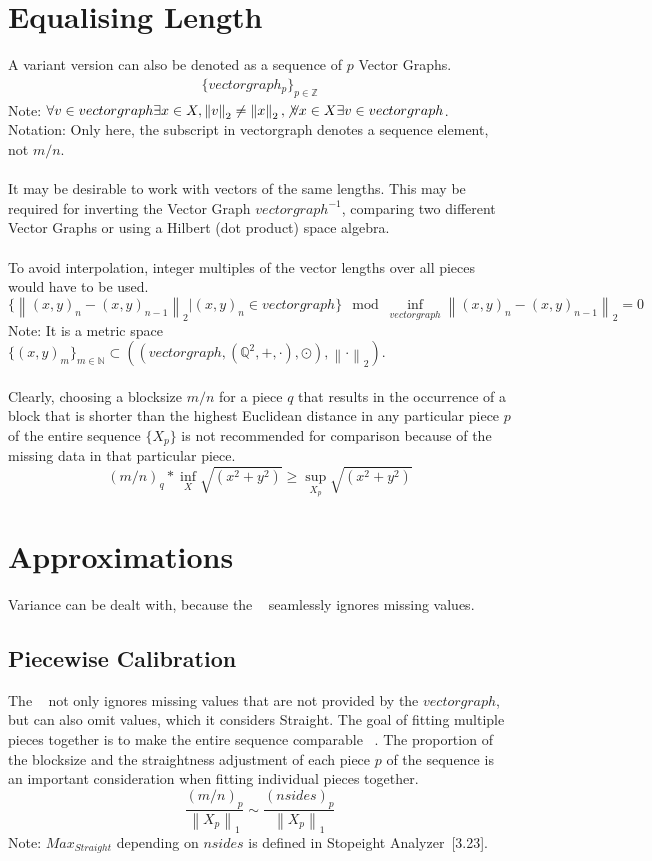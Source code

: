 \documentclass{report}
\newcommand\norm[1]{\left\lVert#1\right\rVert}
\begin{document}
\section{Equalising Length}
A variant version can also be denoted as a sequence of $p$ Vector Graphs.
\begin{align}
\{vectorgraph_{p}\}_{p\in \mathbb{Z}}
\end{align}
Note: $\forall v \in vectorgraph\exists x \in X,\norm{v}_2\not =\norm{x}_2,\not\forall x \in X\exists v \in vectorgraph$.\\
Notation: Only here, the subscript in vectorgraph denotes a sequence element, not $m/n$.\\\\
It may be desirable to work with vectors of the same lengths. This may be required for inverting the Vector Graph $vectorgraph^{-1}$, comparing two different Vector Graphs or using a Hilbert (dot product) space algebra.\\\\
To avoid interpolation, integer multiples of the vector lengths over all pieces would have to be used.
\begin{equation}
\{\norm{(x,y)_{n}-(x,y)_{n-1}}_2\vert (x,y)_{n} \in vectorgraph\} \mod \inf \limits _{vectorgraph} \norm{(x,y)_{n}-(x,y)_{n-1}}_2 = 0
\end{equation}
Note: It is a metric space $\{(x,y)_{m}\}_{m \in \mathbb{N}} \subset ((vectorgraph,(\mathbb{Q}^2,+,\cdot),\odot),\norm{\cdot}_2)$.\\\\
Clearly, choosing a blocksize $m/n$ for a piece $q$ that results in the occurrence of a block that is shorter than the highest Euclidean distance in any particular piece $p$ of the entire sequence $\{X_{p}\}$ is not recommended for comparison because of the missing data in that particular piece.
\begin{equation}
(m/n)_{q}*\inf \limits _{X} \sqrt{(x^2+y^2)} \geq \sup \limits _{X_{p}} \sqrt{(x^2+y^2)}\label{eq:4}
\end{equation}
\section{Approximations}
Variance can be dealt with, because the ~\cite[Stopeight\_Analyzer.tex]{Analyzer} seamlessly ignores missing values.
\subsection{Piecewise Calibration}
The ~\cite[Stopeight\_Analyzer.tex]{Analyzer} not only ignores missing values that are not provided by the $vectorgraph$, but can also omit values, which it considers Straight. The goal of fitting multiple pieces together is to make the entire sequence comparable ~\cite[Non-Orthogonal]{Comparator}. The proportion of the blocksize and the straightness adjustment of each piece $p$ of the sequence is an important consideration when fitting individual pieces together.
\begin{equation}
\frac{(m/n)_{p}}{\norm{X_{p}}_{1}} \sim \frac{(nsides)_{p}}{\norm{X_{p}}_{1}}
\end{equation}
Note: $Max_{Straight}$ depending on $nsides$ is defined in Stopeight Analyzer~\cite{Analyzer}[3.23].
\end{document}
